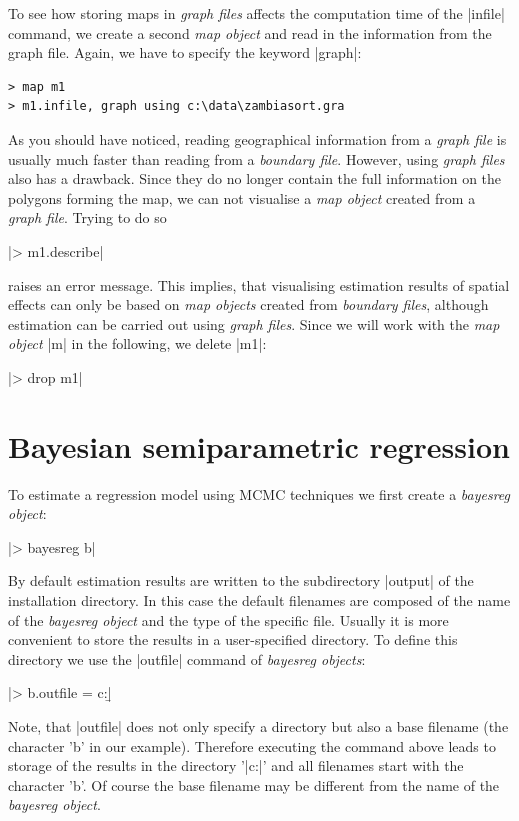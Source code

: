 \documentclass[a4paper]{article}
\begin{document}
To see how storing maps in {\it graph files} affects the computation time of the |infile| command, we create a second {\it map
object} and read in the information from the graph file. Again, we have to specify the keyword |graph|:

\begin{verbatim}
> map m1
> m1.infile, graph using c:\data\zambiasort.gra
\end{verbatim}

As you should have noticed, reading geographical information from
a {\it graph file} is usually much faster than reading from a {\it
boundary file}. However, using {\it graph files} also has a
drawback. Since they do no longer contain the full information on
the polygons forming the map, we can not visualise a {\it map
object} created from a {\it graph file}. Trying to do so

|> m1.describe|

raises an error message. This implies, that visualising estimation results of spatial effects can only be based on {\it map
objects} created from {\it boundary files}, although estimation can be carried out using {\it graph files}. Since we will work
with the {\it map object} |m| in the following, we delete |m1|:

|> drop m1|

\section{Bayesian semiparametric regression}\label{regression}

To estimate a regression model using MCMC techniques we first
create a {\it bayesreg object}:

|> bayesreg b|

By default estimation results are written to the subdirectory |output| of the installation directory. In this case the default
filenames are composed of the name of the {\it bayesreg object} and the type of the specific file. Usually it is more
convenient to store the results in a user-specified directory. To define this directory we use the |outfile| command of {\it
bayesreg objects}:

|> b.outfile = c:\data\b|

Note, that |outfile| does not only specify a directory but also a base filename (the character 'b' in our example). Therefore
executing the command above leads to storage of the results in the directory '|c:\data|' and all filenames start with the
character 'b'. Of course the base filename may be different from the name of the {\it bayesreg object}.
\end{document}
